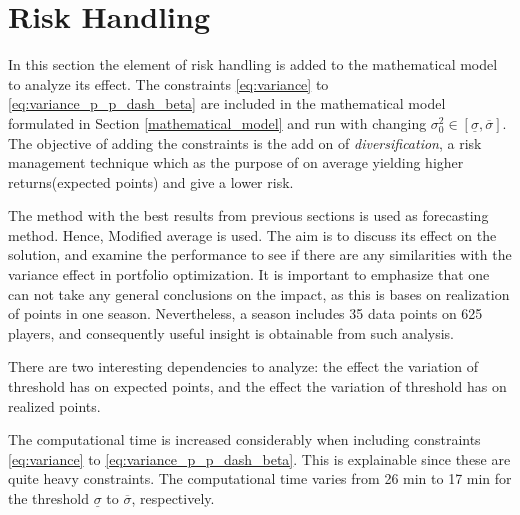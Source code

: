 \section{Risk Handling}

In this section the element of risk handling is added to the mathematical model to analyze its effect. The constraints \ref{eq:variance} to \ref{eq:variance_p_p_dash_beta} are included in the mathematical model formulated in Section \ref{mathematical_model} and run with changing $\sigma_{0}^2 \in [\underline{\sigma}, \overline{\sigma}]$. The objective of adding the constraints is the add on of \textit{diversification}, a risk management technique which as the purpose of on average yielding higher returns(expected points) and give a lower risk.

\newpar

The method with the best results from previous sections is used as forecasting method. Hence, Modified average is used. The aim is to discuss its effect on the solution, and examine the performance to see if there are any similarities with the variance effect in portfolio optimization. It is important to emphasize that one can not take any general conclusions on the impact, as this is bases on realization of points in one season. Nevertheless, a season includes 35 data points on 625 players, and consequently useful insight is obtainable from such analysis.  

\newpar

There are two interesting dependencies to analyze: the effect the variation of threshold has on expected points, and the effect the variation of threshold has on realized points.

\newpar

The computational time is increased considerably when including constraints \ref{eq:variance} to \ref{eq:variance_p_p_dash_beta}. This is explainable since these are quite heavy constraints. The computational time varies from 26 min to 17 min for the threshold $\underline{\sigma}$ to $\overline{\sigma}$, respectively. 


